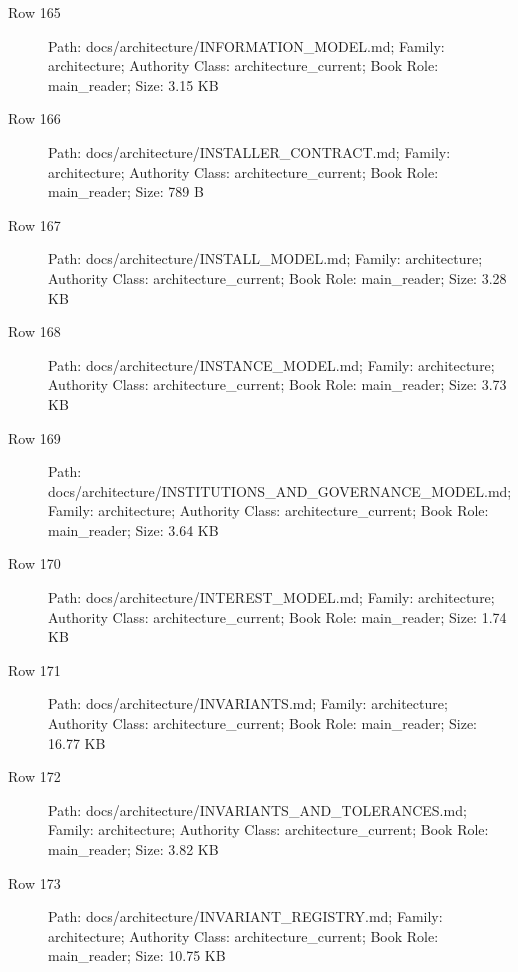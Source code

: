 \documentclass[9pt,a4paper]{book}
\begin{document}
\begin{description}
\item[Row 165] Path: docs/\allowbreak{}architecture/\allowbreak{}INFORMATION\_\allowbreak{}MODEL.\allowbreak{}md; Family: architecture; Authority Class: architecture\_\allowbreak{}current; Book Role: main\_\allowbreak{}reader; Size: 3.\allowbreak{}15 KB
\item[Row 166] Path: docs/\allowbreak{}architecture/\allowbreak{}INSTALLER\_\allowbreak{}CONTRACT.\allowbreak{}md; Family: architecture; Authority Class: architecture\_\allowbreak{}current; Book Role: main\_\allowbreak{}reader; Size: 789 B
\item[Row 167] Path: docs/\allowbreak{}architecture/\allowbreak{}INSTALL\_\allowbreak{}MODEL.\allowbreak{}md; Family: architecture; Authority Class: architecture\_\allowbreak{}current; Book Role: main\_\allowbreak{}reader; Size: 3.\allowbreak{}28 KB
\item[Row 168] Path: docs/\allowbreak{}architecture/\allowbreak{}INSTANCE\_\allowbreak{}MODEL.\allowbreak{}md; Family: architecture; Authority Class: architecture\_\allowbreak{}current; Book Role: main\_\allowbreak{}reader; Size: 3.\allowbreak{}73 KB
\item[Row 169] Path: docs/\allowbreak{}architecture/\allowbreak{}INSTITUTIONS\_\allowbreak{}AND\_\allowbreak{}GOVERNANCE\_\allowbreak{}MODEL.\allowbreak{}md; Family: architecture; Authority Class: architecture\_\allowbreak{}current; Book Role: main\_\allowbreak{}reader; Size: 3.\allowbreak{}64 KB
\item[Row 170] Path: docs/\allowbreak{}architecture/\allowbreak{}INTEREST\_\allowbreak{}MODEL.\allowbreak{}md; Family: architecture; Authority Class: architecture\_\allowbreak{}current; Book Role: main\_\allowbreak{}reader; Size: 1.\allowbreak{}74 KB
\item[Row 171] Path: docs/\allowbreak{}architecture/\allowbreak{}INVARIANTS.\allowbreak{}md; Family: architecture; Authority Class: architecture\_\allowbreak{}current; Book Role: main\_\allowbreak{}reader; Size: 16.\allowbreak{}77 KB
\item[Row 172] Path: docs/\allowbreak{}architecture/\allowbreak{}INVARIANTS\_\allowbreak{}AND\_\allowbreak{}TOLERANCES.\allowbreak{}md; Family: architecture; Authority Class: architecture\_\allowbreak{}current; Book Role: main\_\allowbreak{}reader; Size: 3.\allowbreak{}82 KB
\item[Row 173] Path: docs/\allowbreak{}architecture/\allowbreak{}INVARIANT\_\allowbreak{}REGISTRY.\allowbreak{}md; Family: architecture; Authority Class: architecture\_\allowbreak{}current; Book Role: main\_\allowbreak{}reader; Size: 10.\allowbreak{}75 KB

\end{description}
\end{document}
